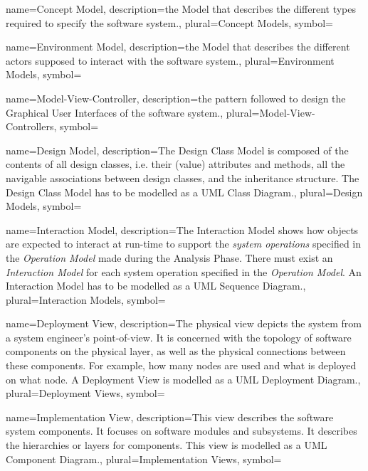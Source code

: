 {name={Concept Model},
description={the Model that describes the different types required to specify
the software system.}, 
plural={Concept Models},
symbol={}
}

{name={Environment Model},
description={the Model that describes the different actors supposed to interact
with the software system.}, 
plural={Environment Models},
symbol={}
}



{name={Model-View-Controller},
description={the pattern followed to design the Graphical User Interfaces
of the software system.}, 
plural={Model-View-Controllers}, 
symbol={}
}


{name={Design Model},
description={The Design Class Model is composed of the contents of all design classes, i.e.
their (value) attributes and methods, all the navigable associations between
design classes, and the inheritance structure. The Design Class Model has to be
modelled as a UML Class Diagram.}, 
plural={Design Models}, 
symbol={}
}


{name={Interaction Model},
description={The Interaction Model shows how objects are expected to interact at run-time to
support the \emph{system operations} specified in the \emph{Operation Model}
made during the Analysis Phase. There must exist an \emph{Interaction Model} for
each system operation specified in the \emph{Operation Model}. An Interaction Model has to be
modelled as a UML Sequence Diagram.}, 
plural={Interaction Models}, 
symbol={}
}

{name={Deployment View},
description={The physical view depicts the system from a system engineer's
point-of-view. It is concerned with the topology of software components on the
physical layer, as well as the physical connections between these components.
For example, how many nodes are used and what is deployed on what node. A
Deployment View is modelled as a UML Deployment Diagram.}, 
plural={Deployment Views}, 
symbol={}
}


{name={Implementation View},
description={This view describes the software system components. It focuses on
software modules and subsystems. It describes the hierarchies or layers for
components. This view is modelled as a UML Component Diagram.},
plural={Implementation Views}, 
symbol={}
}


